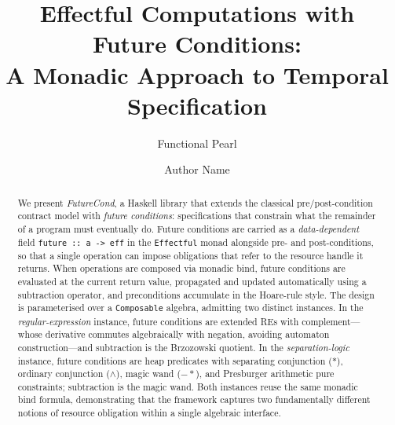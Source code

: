 \documentclass[acmsmall,screen]{acmart}
\begin{document}
\title{Effectful Computations with Future Conditions:\\
       A Monadic Approach to Temporal Specification}

\subtitle{Functional Pearl}

\author{Author Name}

\begin{abstract}
We present \emph{FutureCond}, a Haskell library that extends the classical
pre/post-condition contract model with \emph{future conditions}: specifications
that constrain what the remainder of a program must eventually do.
Future conditions are carried as a \emph{data-dependent} field
\lstinline{future :: a -> eff} in the \lstinline{Effectful} monad
alongside pre- and post-conditions, so that a single operation can
impose obligations that refer to the resource handle it returns.
When operations are composed via monadic bind, future conditions are
evaluated at the current return value, propagated and updated
automatically using a subtraction operator, and preconditions
accumulate in the Hoare-rule style.
The design is parameterised over a \lstinline{Composable} algebra, admitting
two distinct instances.
In the \emph{regular-expression} instance, future conditions are extended REs
with complement---whose derivative commutes algebraically with negation,
avoiding automaton construction---and subtraction is the Brzozowski quotient.
In the \emph{separation-logic} instance, future conditions are heap predicates
with separating conjunction ($*$), ordinary conjunction ($\wedge$),
magic wand ($-*$), and Presburger arithmetic pure constraints;
subtraction is the magic wand.
Both instances reuse the same monadic bind formula, demonstrating that
the framework captures two fundamentally different notions of resource
obligation within a single algebraic interface.
\end{abstract}

\end{document}
